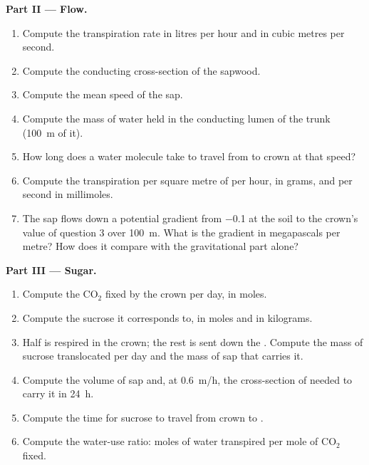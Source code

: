 \begin{problem}
\medskip
\noindent\textbf{Part II --- Flow.}
\begin{enumerate}[resume]
  \item Compute the transpiration rate in litres per hour and in
        cubic metres per second.
  \item Compute the conducting cross-section of the sapwood.
  \item Compute the mean speed of the sap.
  \item Compute the mass of water held in the conducting lumen of the
        trunk (\qty{100}{m} of it).
  \item How long does a water molecule take to travel from  to
        crown at that speed?
  \item Compute the transpiration per square metre of  per hour,
        in grams, and per second in millimoles.
  \item The sap flows down a potential gradient from \qty{-0.1}{} at
        the soil to the crown's value of question 3 over \qty{100}{m}.
        What is the gradient in megapascals per metre? How does it
        compare with the gravitational part alone?
\end{enumerate}

\medskip
\noindent\textbf{Part III --- Sugar.}
\begin{enumerate}[resume]
  \item Compute the $\mathrm{CO_2}$ fixed by the crown per day, in
        moles.
  \item Compute the sucrose it corresponds to, in moles and in
        kilograms.
  \item Half is respired in the crown; the rest is sent down the
        . Compute the mass of sucrose translocated per day and
        the mass of sap that carries it.
  \item Compute the volume of sap and, at \qty{0.6}{m/h}, the
        cross-section of  needed to carry it in \qty{24}{h}.
  \item Compute the time for sucrose to travel from crown to .
  \item Compute the water-use ratio: moles of water transpired per
        mole of $\mathrm{CO_2}$ fixed.
\end{enumerate}


\end{problem}
